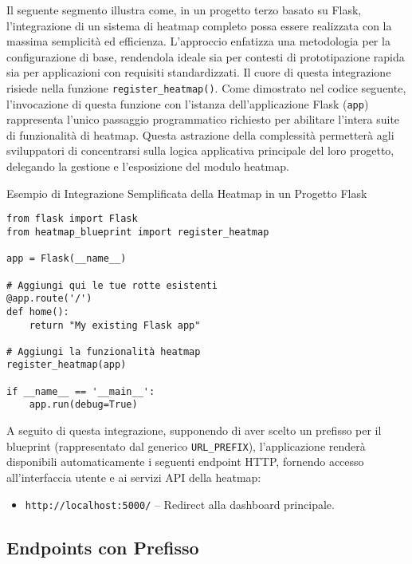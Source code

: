 Il seguente segmento illustra come, in un progetto terzo basato su Flask, l'integrazione di un sistema di heatmap completo possa essere realizzata con la massima semplicità ed efficienza. L'approccio enfatizza una metodologia  per la configurazione di base, rendendola ideale sia per contesti di prototipazione rapida sia per applicazioni con requisiti standardizzati.
Il cuore di questa integrazione risiede nella funzione \texttt{register\_heatmap()}. Come dimostrato nel codice seguente, l'invocazione di questa funzione con l'istanza dell'applicazione Flask (\texttt{app}) rappresenta l'unico passaggio programmatico richiesto per abilitare l'intera suite di funzionalità di heatmap. Questa astrazione della complessità permetterà agli sviluppatori di concentrarsi sulla logica applicativa principale del loro progetto, delegando la gestione e l'esposizione del modulo heatmap.

\begin{listing}[H]
\caption{Esempio di Integrazione Semplificata della Heatmap in un Progetto Flask}
\label{lst:heatmap_simple_integration}
\begin{verbatim}
from flask import Flask
from heatmap_blueprint import register_heatmap

app = Flask(__name__)

# Aggiungi qui le tue rotte esistenti
@app.route('/')
def home():
    return "My existing Flask app"

# Aggiungi la funzionalità heatmap
register_heatmap(app)

if __name__ == '__main__':
    app.run(debug=True)
\end{verbatim}
\end{listing}

A seguito di questa integrazione, supponendo di aver scelto un prefisso per il blueprint (rappresentato dal generico \texttt{URL\_PREFIX}), l'applicazione renderà disponibili automaticamente i seguenti endpoint HTTP, fornendo accesso all'interfaccia utente e ai servizi API della heatmap:

\begin{itemize}
    \item \texttt{http://localhost:5000/} -- Redirect alla dashboard principale.
\end{itemize}

\subsection{Endpoints con Prefisso} %
\label{ss:endpoints}

